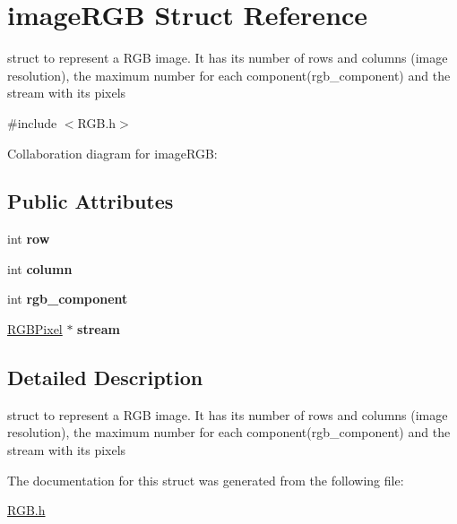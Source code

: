 \hypertarget{structimageRGB}{}\section{image\+R\+GB Struct Reference}
\label{structimageRGB}


struct to represent a R\+GB image. It has its number of rows and columns (image resolution), the maximum number for each component(rgb\+\_\+component) and the stream with its pixels  




{\ttfamily \#include $<$R\+G\+B.\+h$>$}



Collaboration diagram for image\+R\+GB\+:
\subsection*{Public Attributes}
\begin{DoxyCompactItemize}
\item 
\mbox{\label{structimageRGB_afff03c0a09678c0024cc7b5164bb7d51}} 
int {\bfseries row}
\item 
\mbox{\label{structimageRGB_a64117daae40c8a6b465854052d657d91}} 
int {\bfseries column}
\item 
\mbox{\label{structimageRGB_a94452971ba3fdd8fc0657978f222e9ff}} 
int {\bfseries rgb\+\_\+component}
\item 
\mbox{\label{structimageRGB_aa39edd8a80dc9f46d8beae3dc88d4ffd}} 
\hyperlink{structRGBPixel}{R\+G\+B\+Pixel} $\ast$ {\bfseries stream}
\end{DoxyCompactItemize}


\subsection{Detailed Description}
struct to represent a R\+GB image. It has its number of rows and columns (image resolution), the maximum number for each component(rgb\+\_\+component) and the stream with its pixels 

The documentation for this struct was generated from the following file\+:\begin{DoxyCompactItemize}
\item 
\hyperlink{RGB_8h}{R\+G\+B.\+h}\end{DoxyCompactItemize}
